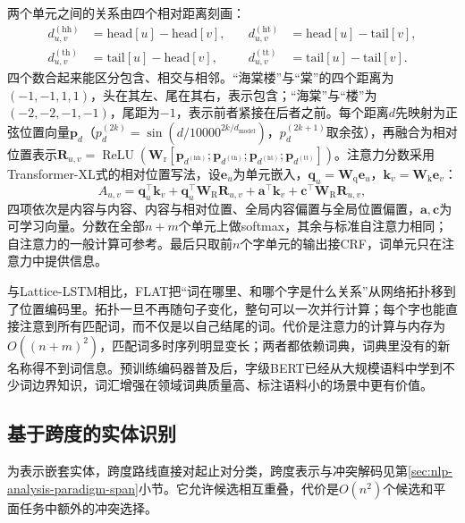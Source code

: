 两个单元之间的关系由四个相对距离刻画：
\begin{equation}
  \begin{aligned}
    d^{(\mathrm{hh})}_{u,v}&=\mathrm{head}[u]-\mathrm{head}[v],&\quad
    d^{(\mathrm{ht})}_{u,v}&=\mathrm{head}[u]-\mathrm{tail}[v],\\
    d^{(\mathrm{th})}_{u,v}&=\mathrm{tail}[u]-\mathrm{head}[v],&\quad
    d^{(\mathrm{tt})}_{u,v}&=\mathrm{tail}[u]-\mathrm{tail}[v].
  \end{aligned}
  \label{eq:nlp-extraction-flat-distance}
\end{equation}
四个数合起来能区分包含、相交与相邻。“海棠楼”与“棠”的四个距离为$(-1,-1,1,1)$，头在其左、尾在其右，表示包含；“海棠”与“楼”为$(-2,-2,-1,-1)$，尾距为$-1$，表示前者紧接在后者之前。每个距离$d$先映射为正弦位置向量$\bm p_d$（$p_d^{(2k)}=\sin(d/10000^{2k/d_{\mathrm{model}}})$，$p_d^{(2k+1)}$取余弦），再融合为相对位置表示$\bm R_{u,v}=\operatorname{ReLU}(\bm W_{\mathrm r}[\bm p_{d^{(\mathrm{hh})}};\bm p_{d^{(\mathrm{th})}};\bm p_{d^{(\mathrm{ht})}};\bm p_{d^{(\mathrm{tt})}}])$。注意力分数采用Transformer-XL式的相对位置写法，设$\bm e_u$为单元嵌入，$\bm q_u=\bm W_{\mathrm q}\bm e_u$，$\bm k_v=\bm W_{\mathrm k}\bm e_v$：
\begin{equation}
  A_{u,v}=\bm q_u^\top\bm k_v+\bm q_u^\top\bm W_{\mathrm R}\bm R_{u,v}+\bm a^\top\bm k_v+\bm c^\top\bm W_{\mathrm R}\bm R_{u,v},
  \label{eq:nlp-extraction-flat-attention}
\end{equation}
四项依次是内容与内容、内容与相对位置、全局内容偏置与全局位置偏置，$\bm a,\bm c$为可学习向量。分数在全部$n+m$个单元上做softmax，其余与标准自注意力相同；自注意力的一般计算可参考。最后只取前$n$个字单元的输出接CRF，词单元只在注意力中提供信息。

与Lattice-LSTM相比，FLAT把“词在哪里、和哪个字是什么关系”从网络拓扑移到了位置编码里。拓扑一旦不再随句子变化，整句可以一次并行计算；每个字也能直接注意到所有匹配词，而不仅是以自己结尾的词。代价是注意力的计算与内存为$O((n+m)^2)$，匹配词多时序列明显变长；两者都依赖词典，词典里没有的新名称得不到词信息。预训练编码器普及后，字级BERT已经从大规模语料中学到不少词边界知识，词汇增强在领域词典质量高、标注语料小的场景中更有价值。

\subsection{基于跨度的实体识别}
\label{sec:nlp-extraction-ner-span}

为表示嵌套实体，跨度路线直接对起止对分类，跨度表示与冲突解码见第\ref{sec:nlp-analysis-paradigm-span}小节。它允许候选相互重叠，代价是$O(n^2)$个候选和平面任务中额外的冲突选择。

